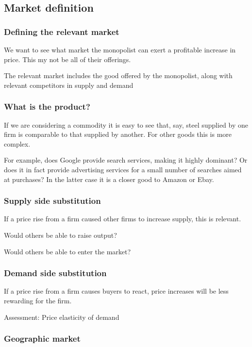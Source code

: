 
\subsection{Market definition}

\subsubsection{Defining the relevant market}

We want to see what market the monopolist can exert a profitable increase in price. This my not be all of their offerings.

The relevant market includes the good offered by the monopolist, along with relevant competitors in supply and demand

\subsubsection{What is the product?}

If we are considering a commodity it is easy to see that, say, steel supplied by one firm is comparable to that supplied by another. For other goods this is more complex.

For example, does Google provide search services, making it highly dominant? Or does it in fact provide advertising services for a small number of searches aimed at purchases? In the latter case it is a closer good to Amazon or Ebay.

\subsubsection{Supply side substitution}

If a price rise from a firm caused other firms to increase supply, this is relevant.

Would others be able to raise output?

Would others be able to enter the market?

\subsubsection{Demand side substitution}

If a price rise from a firm causes buyers to react, price increases will be less rewarding for the firm.

Assessment: Price elasticity of demand

\subsubsection{Geographic market}


